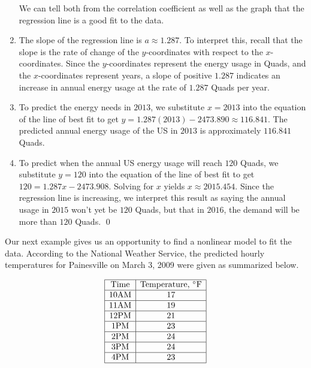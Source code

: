 \begin{ex}
\begin{enumerate}
\begin{center}
\begin{tabular}{cc}
\end{tabular}

\end{center}

We can tell both from the correlation coefficient as well as the graph that the regression line is a good fit to the data.

\item  The slope of the regression line is $a \approx 1.287$.  To interpret this, recall that the slope is the rate of change of the $y$-coordinates with respect to the $x$-coordinates.  Since the $y$-coordinates represent the energy usage in Quads, and the $x$-coordinates represent years, a slope of positive $1.287$ indicates an increase in annual energy usage at the rate of $1.287$ Quads per year.

\item  To predict the energy needs in $2013$, we substitute $x=2013$ into the equation of the line of best fit to get  $y = 1.287(2013)-2473.890 \approx 116.841$.  The predicted annual energy usage of the US in $2013$ is approximately $116.841$ Quads.

\item  To predict when the annual US energy usage will reach $120$ Quads, we substitute $y=120$ into the equation of the line of best fit to get $120 = 1.287x - 2473.908$.  Solving for $x$ yields $x \approx 2015.454$.  Since the regression line is increasing, we interpret this result as saying the annual usage in $2015$ won't yet be $120$ Quads, but that in $2016$, the demand will be more than $120$ Quads. \qed

\end{enumerate}
\end{ex}

Our next example gives us an opportunity to find a nonlinear model to fit the data.  According to the National Weather Service, the predicted hourly temperatures for Painesville on March 3, 2009 were given as summarized below.

\[\begin{array}{|c|c|} \hline
\mbox{Time} & \mbox{Temperature, $^{\circ}$F} \\ \hline
10 \mbox{AM} & 17 \\ \hline
11 \mbox{AM} & 19 \\ \hline
12 \mbox{PM} & 21 \\ \hline
1 \mbox{PM} & 23 \\ \hline
2 \mbox{PM} & 24 \\ \hline
3 \mbox{PM} & 24 \\ \hline
4 \mbox{PM} & 23 \\ \hline

\end{array}\]

